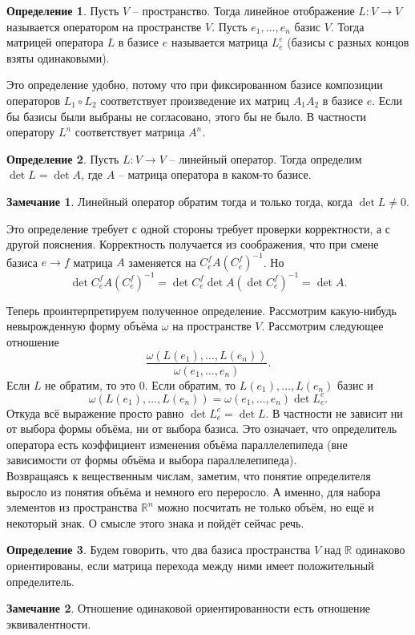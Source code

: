 \documentclass[10pt,a4paper,oneside]{book}
\theoremstyle{definition}
\newtheorem*{rem}{Замечание}
\newtheorem*{defn}{Определение}
\newcommand{\mb}[1]{\mathbb{#1}}
\def\dfn{\begin{defn}}
\def\edfn{\end{defn}}
\def\rm{\begin{rem}}
\def\erm{\end{rem}}
\begin{document}
\dfn Пусть $V$ -- пространство. Тогда линейное отображение $L\colon V \to V$ называется оператором на пространстве $V$. Пусть $e_1,\dots, e_n$ базис $V$. Тогда матрицей оператора $L$ в базисе $e$ называется матрица $L_e^e$ (базисы с разных концов взяты одинаковыми).
\edfn

Это определение удобно, потому что при фиксированном базисе композиции операторов $L_1\circ L_2$ соответствует произведение их матриц $A_1A_2$ в базисе $e$. Если бы базисы были выбраны не согласовано, этого бы не было. В частности оператору $L^n$ соответствует матрица $A^n$.

\dfn Пусть $L\colon V \to V$ -- линейный оператор. Тогда определим $\det L=\det A$, где $A$ -- матрица оператора в каком-то базисе.
\edfn

\rm Линейный оператор обратим тогда и только тогда, когда $\det L \neq 0$.
\erm

Это определение требует с одной стороны требует проверки корректности, а с другой пояснения. Корректность получается из соображения, что при смене базиса $e\to f$ матрица $A$ заменяется на $C_e^fA (C_e^f)^{-1}$. Но
$$\det C_e^fA (C_e^f)^{-1}= \det C_e^f \det A (\det C_e^f)^{-1}= \det A.$$



Теперь проинтерпретируем полученное определение. Рассмотрим какую-нибудь невырожденную форму объёма $\omega$ на пространстве $V$. Рассмотрим следующее отношение
$$\frac{\omega(L(e_1),\dots,L(e_n))}{\omega(e_1,\dots,e_n)}.$$
Если $L$ не обратим, то это 0. Если обратим, то $L(e_1),\dots,L(e_n)$ базис и $$\omega(L(e_1),\dots,L(e_n))=\omega(e_1,\dots,e_n) \det L_e^e.$$
Откуда всё выражение просто равно $\det L_e^e=\det L$. В частности не зависит ни от выбора формы объёма, ни от выбора базиса.
Это означает, что определитель оператора есть коэффициент изменения объёма параллелепипеда (вне зависимости от формы объёма и выбора параллелепипеда).\\



Возвращаясь к вещественным числам, заметим, что понятие определителя выросло из понятия объёма и немного его переросло. А именно, для набора элементов из пространства $\mb R^n$ можно посчитать не только объём, но ещё и некоторый знак. О смысле этого знака и пойдёт сейчас речь.

\dfn Будем говорить, что два базиса пространства $V$ над $\mb R$ одинаково ориентированы, если матрица перехода между ними имеет положительный определитель.
\edfn

\rm Отношение одинаковой ориентированности есть отношение эквивалентности.
\erm
\end{document}
